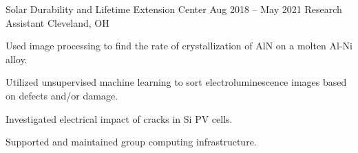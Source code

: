 \documentclass[10pt]{article}
\begin{document}
{    
\vspace{0.25cm}
	\job
	{Solar Durability and Lifetime Extension Center}
	{Aug 2018 – May 2021}
	{Research Assistant}
	{Cleveland, OH}
	\
	
	{\begin{newitemize}

		\item Used image processing to find the rate of crystallization of AlN on a molten Al-Ni alloy.
		\item Utilized unsupervised machine learning to sort electroluminescence images based on defects and/or damage.
		\item Investigated electrical impact of cracks in Si PV cells.
		\item Supported and maintained group computing infrastructure. 
	
		\end{newitemize}}
%	
	
}	
\end{document}
